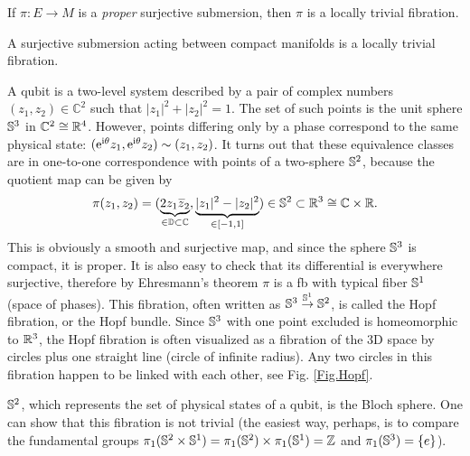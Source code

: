\begin{thm}\label{thm Ehresmann}
    If $\pi:E\to M$ is a \emph{proper} surjective submersion, then $\pi$ is a locally trivial fibration.
\end{thm}

\begin{cor}
    A surjective submersion acting between compact manifolds is a locally trivial fibration.
\end{cor}


\begin{example}\label{Hopf bundle}
    A qubit is a two-level system described by a pair of complex numbers $(z_1,z_2)\in\mathbb{C}^2$ such that $|z_1|^2+|z_2|^2=1$. The set of such points is the unit sphere $\mathbb{S}^3$ in $\mathbb{C}^2\cong\mathbb{R}^4$. However, points differing only by a phase correspond to the same physical state: $(\mathrm{e}^{\mathrm{i}\theta}z_1,\mathrm{e}^{\mathrm{i}\theta}z_2)\sim(z_1,z_2)$. It turns out that these equivalence classes are in one-to-one correspondence with points of a two-sphere $\mathbb{S}^2$, because the quotient map can be given by
    \[\pi(z_1,z_2)=(\underbrace{2z_1\wb{z}_2}_{\in \mathbb{D}\subset\mathbb{C}},\underbrace{|z_1|^2-|z_2|^2}_{\in [-1,1]})\in \bbS^2\subset\bbR^3\cong \mathbb{C}\times\bbR.\]
    This is obviously a smooth and surjective map, and since the sphere $\mathbb{S}^3$ is compact, it is proper. It is also easy to check that its differential is everywhere surjective, therefore by Ehresmann's theorem $\pi$ is a \gls{fb} with typical fiber $\mathbb{S}^1$ (space of phases). This fibration, often written as $\mathbb{S}^3\overset{\mathbb{S}^1}{\to}\mathbb{S}^2$, is called the Hopf fibration, or the Hopf bundle. Since $\mathbb{S}^3$ with one point excluded is homeomorphic to $\mathbb{R}^3$, the Hopf fibration is often visualized as a fibration of the 3D space by circles plus one straight line (circle of infinite radius). Any two circles in this fibration happen to be linked with each other, see Fig. \ref{Fig.Hopf}.
    
    $\mathbb{S}^2$, which represents the set of physical states of a qubit, is the Bloch sphere. One can show that this fibration is not trivial (the easiest way, perhaps, is to compare the fundamental groups $\pi_1(\mathbb{S}^2\times \mathbb{S}^1)=\pi_1(\mathbb{S}^2)\times\pi_1(\mathbb{S}^1)=\mathbb{Z}$ and $\pi_1(\mathbb{S}^3)=\{e\}$).
    

\end{example}
